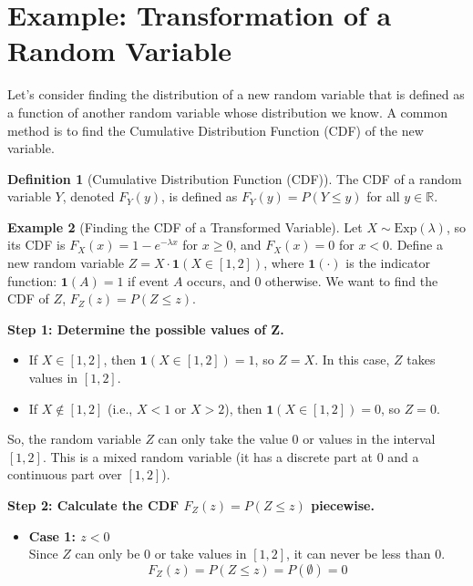 \documentclass[11pt]{article}
\theoremstyle{definition}
\newtheorem{definition}{Definition}[section]
\newtheorem{example}[definition]{Example}
\newcommand{\R}{\mathbb{R}} %
\newcommand{\I}{\mathbf{1}} %
\begin{document}
\section{Example: Transformation of a Random Variable}

Let's consider finding the distribution of a new random variable that is defined as a function of another random variable whose distribution we know. A common method is to find the Cumulative Distribution Function (CDF) of the new variable.

\begin{definition}[Cumulative Distribution Function (CDF)]
The CDF of a random variable $Y$, denoted $F_Y(y)$, is defined as $F_Y(y) = P(Y \le y)$ for all $y \in \R$.
\end{definition}

\begin{example}[Finding the CDF of a Transformed Variable]
Let $X \sim \text{Exp}(\lambda)$, so its CDF is $F_X(x) = 1 - e^{-\lambda x}$ for $x \ge 0$, and $F_X(x) = 0$ for $x < 0$.
Define a new random variable $Z = X \cdot \I(X \in [1, 2])$, where $\I(\cdot)$ is the indicator function: $\I(A) = 1$ if event $A$ occurs, and $0$ otherwise. We want to find the CDF of $Z$, $F_Z(z) = P(Z \le z)$.

\textbf{Step 1: Determine the possible values of Z.}
\begin{itemize}
    \item If $X \in [1, 2]$, then $\I(X \in [1, 2]) = 1$, so $Z = X$. In this case, $Z$ takes values in $[1, 2]$.
    \item If $X \notin [1, 2]$ (i.e., $X < 1$ or $X > 2$), then $\I(X \in [1, 2]) = 0$, so $Z = 0$.
\end{itemize}
So, the random variable $Z$ can only take the value $0$ or values in the interval $[1, 2]$. This is a mixed random variable (it has a discrete part at $0$ and a continuous part over $[1, 2]$).

\textbf{Step 2: Calculate the CDF $F_Z(z) = P(Z \le z)$ piecewise.}

\begin{itemize}
    \item \textbf{Case 1: $z < 0$} \\
    Since $Z$ can only be $0$ or take values in $[1, 2]$, it can never be less than $0$.
    \[ F_Z(z) = P(Z \le z) = P(\emptyset) = 0 \]


\end{itemize}
\end{example}
\end{document}
